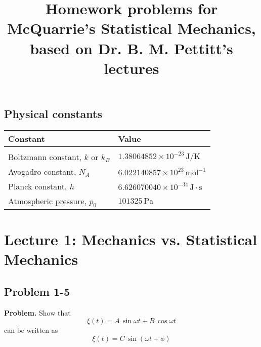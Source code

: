 \documentclass[twocolumn, 10pt]{article}
\numberwithin{equation}{section}
\newenvironment{problem}
{\par\medskip \color{problue}
  \textbf{Problem. }\ignorespaces}
{\medskip}
\begin{document}
\title{Homework problems for McQuarrie's Statistical Mechanics, \\
  based on Dr. B. M. Pettitt's lectures}
\author{\vspace{-10ex}}
\date{\vspace{-10ex}}
\maketitle

\tableofcontents

%

\subsection*{Physical constants}

\begin{table}[h]\centering\small
  \begin{tabular}{l l}
    Constant & Value \\
    \hline \\
    Boltzmann constant, $k$ or $k_B$ &
    $1.38064852\times10^{-23} \, \mathrm{J/K}$
    \\
    Avogadro constant, $N_A$ &
    $6.022140857\times10^{23} \, \mathrm{mol}^{-1}$
    \\
    Planck constant, $h$ &
    $6.626070040\times10^{-34} \, \mathrm{J\cdot s}$
    \\
    Atmospheric pressure, $p_0$ &
    $101325 \, \mathrm{Pa}$
  \end{tabular}
\end{table}


\section{Lecture 1: Mechanics vs. Statistical Mechanics}

\subsection{Problem 1-5}

\begin{problem}
  Show that
  $$\xi(t) = A \, \sin \omega t + B \, \cos \omega t$$
  can be written as
  $$\xi(t) = C \, \sin( \omega t + \phi)$$
\end{problem}
\end{document}
